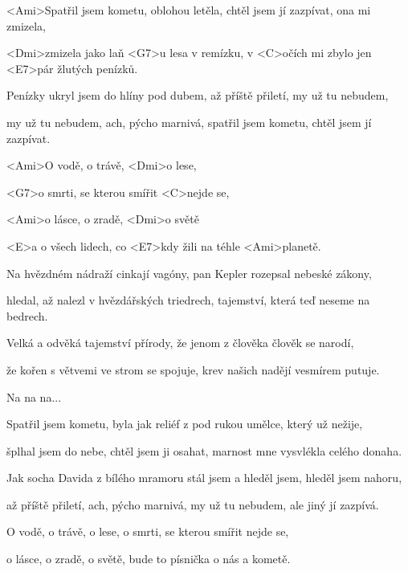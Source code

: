 

\zs
<Ami>Spatřil jsem kometu, oblohou letěla,
chtěl jsem jí zazpívat, ona mi zmizela,

<Dmi>zmizela jako laň <G7>u lesa v remízku,
v <C>očích mi zbylo jen <E7>pár žlutých penízků.
\ks

\zs
Penízky ukryl jsem do hlíny pod dubem,
až příště přiletí, my už tu nebudem,

my už tu nebudem, ach, pýcho marnivá,
spatřil jsem kometu, chtěl jsem jí zazpívat.
\ks

\zr
<Ami>O vodě, o trávě, <Dmi>o lese,

<G7>o smrti, se kterou smířit <C>nejde se,

<Ami>o lásce, o zradě, <Dmi>o světě

<E>a o všech lidech, co <E7>kdy žili na téhle <Ami>planetě.
\kr

\zs
Na hvězdném nádraží cinkají vagóny,
pan Kepler rozepsal nebeské zákony,

hledal, až nalezl v hvězdářských triedrech,
tajemství, která teď neseme na bedrech.
\ks

\zs
Velká a odvěká tajemství přírody,
že jenom z člověka člověk se narodí,

že kořen s větvemi ve strom se spojuje,
krev našich nadějí vesmírem putuje.
\ks

\zr
Na na na...
\kr

\zs
Spatřil jsem kometu, byla jak reliéf
z pod rukou umělce, který už nežije,

šplhal jsem do nebe, chtěl jsem ji osahat,
marnost mne vysvlékla celého donaha.
\ks

\zs
Jak socha Davida z bílého mramoru
stál jsem a hleděl jsem, hleděl jsem nahoru,

až příště přiletí, ach, pýcho marnivá,
my už tu nebudem, ale jiný jí zazpívá.
\ks

\zr
O vodě, o trávě, o lese,
o smrti, se kterou smířit nejde se,

o lásce, o zradě, o světě,
bude to písnička o nás a kometě.
\kr

\kp
